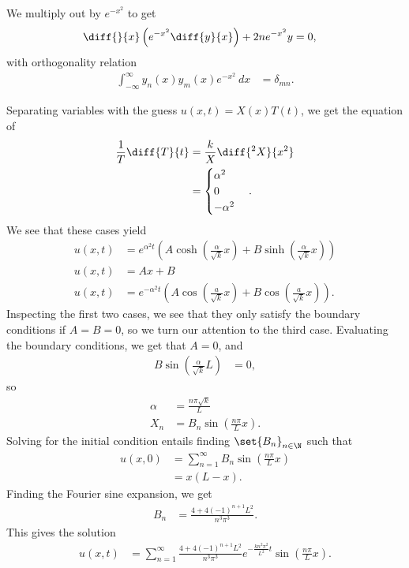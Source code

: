 \documentclass[10pt]{mypackage}
\begin{document}
\begin{solution}[11.4, Problem 10]
  We multiply out by $e^{-x^2}$ to get
  \begin{align*}
    \diff{}{x}\left( e^{-x^2}\diff{y}{x} \right) + 2ne^{-x^2}y &= 0,
  \end{align*}
  with orthogonality relation
  \begin{align*}
    \int_{-\infty}^{\infty} y_n(x)y_m(x)e^{-x^2}\:dx &= \delta_{mn}.
  \end{align*}
\end{solution}
\begin{solution}[12.3, Problem 2]
  Separating variables with the guess $u(x,t) = X(x)T(t)$, we get the equation of
  \begin{align*}
    \frac{1}{T}\diff{T}{t} &= \frac{k}{X}\diff{^2X}{x^2}\\
                           &= \begin{cases}
                             \alpha^2\\
                             0\\
                             -\alpha^2
                           \end{cases}.
  \end{align*}
  We see that these cases yield
  \begin{align*}
    u\left( x,t \right) &= e^{\alpha^2 t}\left( A\cosh\left( \frac{\alpha}{\sqrt{k}}x \right) + B\sinh\left( \frac{\alpha}{\sqrt{k}}x \right) \right)\\
    u\left( x,t \right) &= Ax + B\\
    u\left( x,t \right) &= e^{-\alpha^2t}\left( A\cos\left( \frac{a}{\sqrt{k}}x \right) + B\cos\left( \frac{a}{\sqrt{k}}x \right) \right).
  \end{align*}
  Inspecting the first two cases, we see that they only satisfy the boundary conditions if $A = B = 0$, so we turn our attention to the third case. Evaluating the boundary conditions, we get that $A = 0$, and
  \begin{align*}
    B\sin\left( \frac{\alpha}{\sqrt{k}} L \right) &= 0,
  \end{align*}
  so 
  \begin{align*}
    \alpha &= \frac{n\pi\sqrt{k}}{L}\\
    X_n &= B_n\sin\left( \frac{n\pi}{L}x \right).
  \end{align*}
  Solving for the initial condition entails finding $\set{B_n}_{n\in\N}$ such that
  \begin{align*}
    u\left( x,0 \right) &= \sum_{n=1}^{\infty}B_n\sin\left( \frac{n\pi}{L}x \right)\\
                        &= x\left( L-x \right).
  \end{align*}
  Finding the Fourier sine expansion, we get
  \begin{align*}
    B_n &= \frac{4 + 4\left( -1 \right)^{n+1}L^2}{n^3\pi^3}.
  \end{align*}
  This gives the solution
  \begin{align*}
    u\left( x,t \right) &= \sum_{n=1}^{\infty}\frac{4 + 4\left( -1 \right)^{n+1}L^2}{n^3\pi^3}e^{-\frac{kn^2\pi^2}{L^2} t} \sin\left( \frac{n\pi }{L}x \right).
  \end{align*}
\end{solution}
\end{document}
